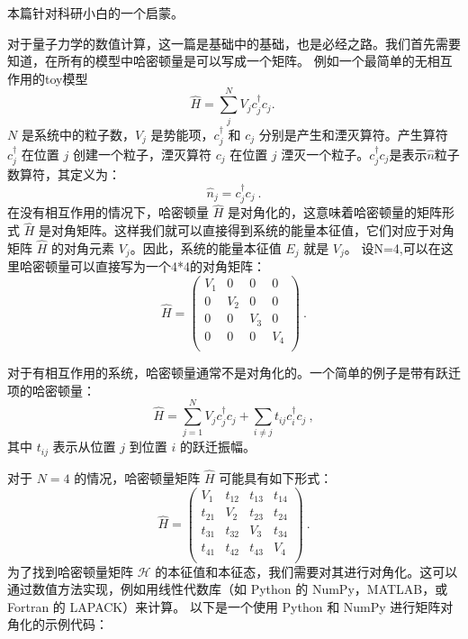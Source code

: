 
\begin{issues}
\issueDraft       %
\end{issues}
本篇针对科研小白的一个启蒙。

对于量子力学的数值计算，这一篇是基础中的基础，也是必经之路。我们首先需要知道，在所有的模型中哈密顿量是可以写成一个矩阵。
例如一个最简单的无相互作用的toy模型
\begin{equation}\label{ham1}
\hat{H}=  \sum_j^{N}V_j c_j^{\dagger}c_j.~
\end{equation}
$N$ 是系统中的粒子数，$V_j$ 是势能项，$c_j^{\dagger}$ 和 $c_j$ 分别是产生和湮灭算符。产生算符 $c_j^{\dagger}$ 在位置 $j$ 创建一个粒子，湮灭算符 $c_j$ 在位置 $j$ 湮灭一个粒子。$c_j^{\dagger}c_j$是表示$\hat{n}$粒子数算符，其定义为：
\begin{equation}
\hat{n}_j = c_j^{\dagger} c_j~.
\end{equation}
在没有相互作用的情况下，哈密顿量 $\hat{H}$ 是对角化的，这意味着哈密顿量的矩阵形式 $\hat{H}$ 是对角矩阵。这样我们就可以直接得到系统的能量本征值，它们对应于对角矩阵 $\hat{H}$ 的对角元素 $V_j$。因此，系统的能量本征值 ${E_j}$ 就是 ${V_j}$。
设N=4,可以在这里哈密顿量可以直接写为一个4*4的对角矩阵：
\begin{equation}
\hat{H}=\left(
\begin{matrix}
V_1 & 0& 0&0\\
0 &V_2&0&0\\
0&0&V_3&0\\
0&0&0&V_4\\
\end{matrix}
\right)~.
\end{equation}

对于有相互作用的系统，哈密顿量通常不是对角化的。一个简单的例子是带有跃迁项的哈密顿量：
\begin{equation}\label{ham2}
\hat{H} = \sum_{j=1}^{N} V_j c_j^{\dagger} c_j + \sum_{i \ne j} t_{ij} c_i^{\dagger} c_j~,
\end{equation}
其中 $t_{ij}$ 表示从位置 $j$ 到位置 $i$ 的跃迁振幅。

对于 $N=4$ 的情况，哈密顿量矩阵 $\hat{H}$ 可能具有如下形式：
\begin{equation}
\hat{H}=\left(
\begin{matrix}
V_1 & t_{12} & t_{13} & t_{14} \\
t_{21} & V_2 & t_{23} & t_{24} \\
t_{31} & t_{32} & V_3 & t_{34} \\
t_{41} & t_{42} & t_{43} & V_4 \\
\end{matrix}
\right)~.
\end{equation}
为了找到哈密顿量矩阵 $\mathcal{H}$ 的本征值和本征态，我们需要对其进行对角化。这可以通过数值方法实现，例如用线性代数库（如 Python 的 NumPy，MATLAB，或 Fortran 的 LAPACK）来计算。
以下是一个使用 Python 和 NumPy 进行矩阵对角化的示例代码：

